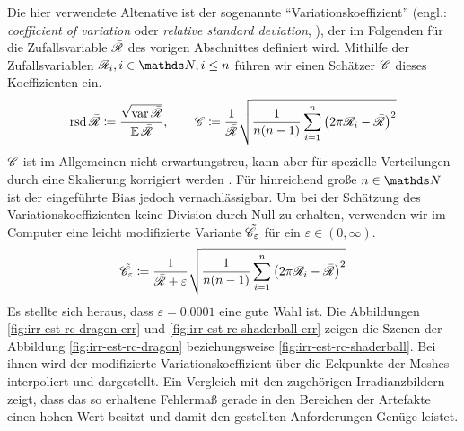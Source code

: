 		Die hier verwendete Altenative ist der sogenannte \enquote{Variationskoeffizient} (engl.: \textit{coefficient of variation} oder \textit{relative standard deviation}, \cite{coeff-of-variation}), der im Folgenden für die Zufallsvariable $\bar{\mathscr{R}}$ des vorigen Abschnittes definiert wird.
		Mithilfe der Zufallsvariablen $\e{R}_i,i\in\SN,i\leq n$ führen wir einen Schätzer $\mathscr{C}$ dieses Koeffizienten ein.
		\[
			\operatorname{rsd} \bar{\mathscr{R}} \coloneqq \frac{\sqrt{\operatorname{var} \bar{\mathscr{R}}}}{\operatorname{\mathbb{E}} \bar{\mathscr{R}}},\qquad \mathscr{C} \coloneqq \frac{1}{ \bar{\mathscr{R}} } \sqrt{\frac{1}{n(n-1)}\sum_{i=1}^n \left( 2\pi\mathscr{R}_i - \bar{\mathscr{R}} \right)^2}
		\]
		$\mathscr{C}$ ist im Allgemeinen nicht erwartungstreu, kann aber für spezielle Verteilungen durch eine Skalierung korrigiert werden \cite{coeff-of-variation}.
		Für hinreichend große $n\in\SN$ ist der eingeführte Bias jedoch vernachlässigbar.
		Um bei der Schätzung des Variationskoeffizienten keine Division durch Null zu erhalten, verwenden wir im Computer eine leicht modifizierte Variante $\tilde{\mathscr{C}}_\varepsilon$ für ein $\varepsilon\in(0,\infty)$.
		\[
			\tilde{\mathscr{C}}_\varepsilon \coloneqq \frac{1}{ \bar{\mathscr{R}} + \varepsilon } \sqrt{\frac{1}{n(n-1)}\sum_{i=1}^n \left( 2\pi\mathscr{R}_i - \bar{\mathscr{R}} \right)^2}
		\]
		Es stellte sich heraus, dass $\varepsilon = 0.0001$ eine gute Wahl ist.
		Die Abbildungen \ref{fig:irr-est-rc-dragon-err} und \ref{fig:irr-est-rc-shaderball-err} zeigen die Szenen der Abbildung \ref{fig:irr-est-rc-dragon} beziehungsweise \ref{fig:irr-est-rc-shaderball}.
		Bei ihnen wird der modifizierte Variationskoeffizient über die Eckpunkte der Meshes interpoliert und dargestellt.
		Ein Vergleich mit den zugehörigen Irradianzbildern zeigt, dass das so erhaltene Fehlermaß gerade in den Bereichen der Artefakte einen hohen Wert besitzt und damit den gestellten Anforderungen Genüge leistet.

